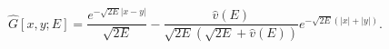 \begin{equation}
\label{fixed-e2}
\hat{G}[x, y; E] = \frac{e^{-\sqrt{2E} |x - y|}}{\sqrt{2E}} - 
\frac{\hat{v}(E)}{\sqrt{2E} ( \sqrt{2E} + \hat{v}(E) )}
e^{-\sqrt{2E} (|x| + |y|)}.
\end{equation}

